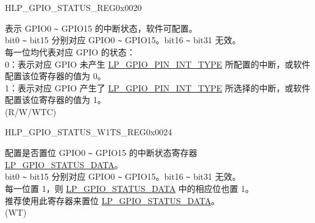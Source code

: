 \begin{register}{H}{LP\_GPIO\_STATUS\_REG}{0x0020}\label{regdesc:LPGPIOSTATUSREG}
%
%
\regnewline%
\begin{regdesc}\begin{reglist}
\label{fielddesc:LPGPIOSTATUSDATA}\item [LP\_GPIO\_STATUS\_DATA]  表示 GPIO0 \verb+~+ GPIO15 的中断状态，软件可配置。\\
bit0 \verb+~+ bit15 分别对应 GPIO0 \verb+~+ GPIO15。bit16 \verb+~+ bit31 无效。\\
每一位均代表对应 GPIO 的状态：\\
0：表示对应 GPIO 未产生  \hyperref[fielddesc:LPGPIOPINNINTTYPE]{LP\_GPIO\_PIN\_INT\_TYPE} 所配置的中断，或软件配置该位寄存器的值为 0。\\
1：表示对应 GPIO 产生了  \hyperref[fielddesc:LPGPIOPINNINTTYPE]{LP\_GPIO\_PIN\_INT\_TYPE} 所选择的中断，或软件配置该位寄存器的值为 1。\\
(R/W/WTC)
\end{reglist}\end{regdesc}
\end{register}


\begin{register}{H}{LP\_GPIO\_STATUS\_W1TS\_REG}{0x0024}\label{regdesc:LPGPIOSTATUSW1TSREG}
%
%
\regnewline%
\begin{regdesc}\begin{reglist}
\label{fielddesc:LPGPIOSTATUSDATAW1TS}\item [LP\_GPIO\_STATUS\_DATA\_W1TS] 配置是否置位 GPIO0 \verb+~+ GPIO15 的中断状态寄存器 \hyperref[fielddesc:LPGPIOSTATUSDATA]{LP\_GPIO\_STATUS\_DATA}。\\
bit0 \verb+~+ bit15 分别对应 GPIO0 \verb+~+ GPIO15。bit16 \verb+~+ bit31 无效。\\
每一位置 1，则  \hyperref[fielddesc:LPGPIOSTATUSDATA]{LP\_GPIO\_STATUS\_DATA} 中的相应位也置 1。 \\
推荐使用此寄存器来置位  \hyperref[fielddesc:LPGPIOSTATUSDATA]{LP\_GPIO\_STATUS\_DATA}。\\
(WT)
\end{reglist}\end{regdesc}
\end{register}


